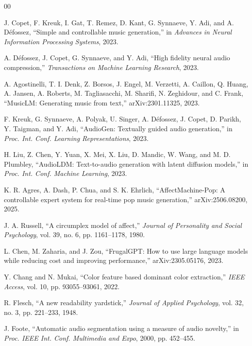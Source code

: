 \documentclass[conference]{IEEEtran}
\begin{document}
\scriptsize
\begin{thebibliography}{00}

 J. Copet, F. Kreuk, I. Gat, T. Remez, D. Kant, G. Synnaeve, Y. Adi, and A. D\'efossez, ``Simple and controllable music generation,'' in \emph{Advances in Neural Information Processing Systems}, 2023.

 A. D\'efossez, J. Copet, G. Synnaeve, and Y. Adi, ``High fidelity neural audio compression,'' \emph{Transactions on Machine Learning Research}, 2023.

 A. Agostinelli, T. I. Denk, Z. Borsos, J. Engel, M. Verzetti, A. Caillon, Q. Huang, A. Jansen, A. Roberts, M. Tagliasacchi, M. Sharifi, N. Zeghidour, and C. Frank, ``MusicLM: Generating music from text,'' arXiv:2301.11325, 2023.

 F. Kreuk, G. Synnaeve, A. Polyak, U. Singer, A. D\'efossez, J. Copet, D. Parikh, Y. Taigman, and Y. Adi, ``AudioGen: Textually guided audio generation,'' in \emph{Proc. Int. Conf. Learning Representations}, 2023.

 H. Liu, Z. Chen, Y. Yuan, X. Mei, X. Liu, D. Mandic, W. Wang, and M. D. Plumbley, ``AudioLDM: Text-to-audio generation with latent diffusion models,'' in \emph{Proc. Int. Conf. Machine Learning}, 2023.

 K. R. Agres, A. Dash, P. Chua, and S. K. Ehrlich, ``AffectMachine-Pop: A controllable expert system for real-time pop music generation,'' arXiv:2506.08200, 2025.

 J. A. Russell, ``A circumplex model of affect,'' \emph{Journal of Personality and Social Psychology}, vol. 39, no. 6, pp. 1161--1178, 1980.

 L. Chen, M. Zaharia, and J. Zou, ``FrugalGPT: How to use large language models while reducing cost and improving performance,'' arXiv:2305.05176, 2023.

 Y. Chang and N. Mukai, ``Color feature based dominant color extraction,'' \emph{IEEE Access}, vol. 10, pp. 93055--93061, 2022.

 R. Flesch, ``A new readability yardstick,'' \emph{Journal of Applied Psychology}, vol. 32, no. 3, pp. 221--233, 1948.

 J. Foote, ``Automatic audio segmentation using a measure of audio novelty,'' in \emph{Proc. IEEE Int. Conf. Multimedia and Expo}, 2000, pp. 452--455.


\end{thebibliography}
\end{document}
